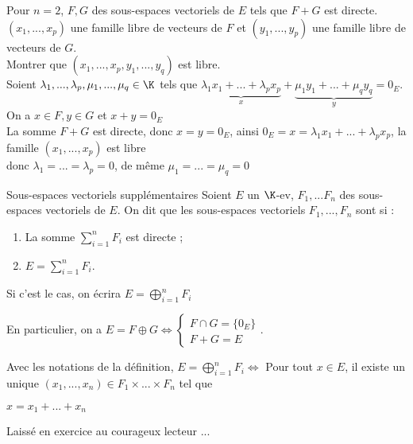 \documentclass[12pt, a4paper]{report}
\begin{document}
\begin{demo}{}
Pour $n = 2$, $F,G$ des sous-espaces vectoriels de $E$ tels que $F+G$ est directe. \\
$(x_1,...,x_p)$ une famille libre de vecteurs de $F$ et $(y_1,...,y_p)$ une famille libre de vecteurs de $G$. \\
Montrer que $(x_1,...,x_p, y_1,...,y_q)$ est libre. \\
Soient $\lambda_1,...,\lambda_p, \mu_1,...,\mu_q \in \K$ tels que $\underbrace{\lambda_1x_1+...+\lambda_px_p}_{x} + \underbrace{\mu_1y_1+...+\mu_qy_q}_{y} = 0_E$. \\
On a $x \in F, y \in G$ et $x+y = 0_E$ \\
La somme $F+G$ est directe, donc $x=y=0_E$, ainsi $0_E = x = \lambda_1x_1+...+\lambda_px_p$, la famille $(x_1,...,x_p)$ est libre \\
donc $\lambda_1=...=\lambda_p = 0$, de même $\mu_1=...=\mu_q = 0$
\end{demo}

\begin{definition}{Sous-espaces vectoriels supplémentaires}{}
Soient $E$ un $\K$-ev, $F_1,...F_n$ des sous-espaces vectoriels de $E$. On dit que les sous-espaces vectoriels $F_1,...,F_n$ sont  si :
\begin{enumerate}
	\item La somme $\displaystyle{\sum_{i=1}^nF_i}$ est directe ;
	\item $E = \displaystyle{\sum_{i=1}^nF_i}$.
\end{enumerate}
Si c'est le cas, on écrira $E = \displaystyle{\bigoplus_{i=1}^nF_i}$
\end{definition}

En particulier, on a $E = F \oplus G \Longleftrightarrow
\begin{cases}
F \cap G = \{0_E\} \\
F+G = E
\end{cases}$.

\begin{proposition}{}
Avec les notations de la définition, $E = \displaystyle{\bigoplus_{i=1}^nF_i} \Longleftrightarrow$ Pour tout $x \in E$, il existe un unique $(x_1,...,x_n) \in F_1 \times ... \times F_n$ tel que 
\begin{center}
$x = x_1+...+x_n$
\end{center}
\end{proposition}

\begin{demo}{}
Laissé en exercice au courageux lecteur ...
\end{demo}
\end{document}
